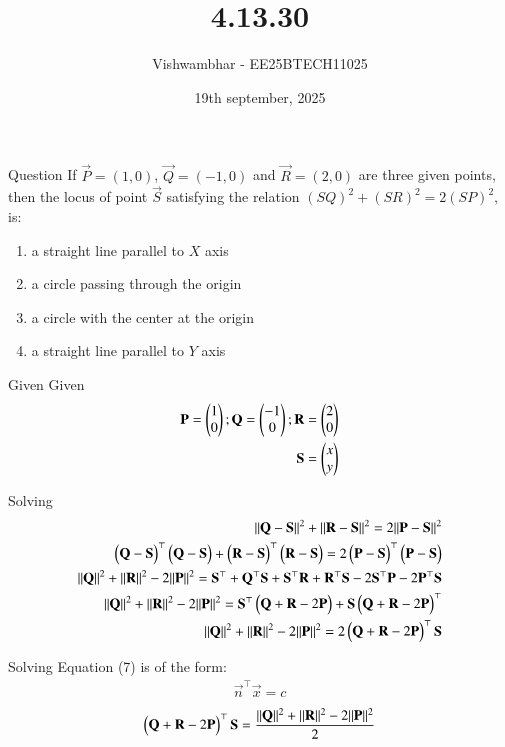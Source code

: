 \documentclass{beamer}
\title{4.13.30}
\date{19th september, 2025}
\author{Vishwambhar - EE25BTECH11025}
\begin{document}
\frame{\titlepage}
\begin{frame}{Question}
If $\vec{P}=(1,0)$, $\vec{Q} = (-1,0)$  and $\vec{R}=(2,0)$ are three given points, then the locus of point $\vec{S}$ satisfying the relation $(SQ)^2+(SR)^2=2(SP)^2$, is:\\
\begin{enumerate}
    \item a straight line parallel to $X$ axis
    \item a circle passing through the origin
    \item a circle with the center at the origin
    \item a straight line parallel to $Y$ axis
\end{enumerate}
\end{frame}

\begin{frame}{Given}
Given
\begin{align}
    \mathbf{P}=\begin{pmatrix}1\\0\end{pmatrix}; \mathbf{Q}=\begin{pmatrix}-1\\0\end{pmatrix}; \mathbf{R}=\begin{pmatrix}2\\0\end{pmatrix}\\
    \mathbf{S}=\begin{pmatrix}x\\y\end{pmatrix}
\end{align}
\end{frame}

\begin{frame}{Solving}
\begin{align}
    ||\mathbf{Q}-\mathbf{S}||^2+||\mathbf{R}-\mathbf{S}||^2=2||\mathbf{P}-\mathbf{S}||^2\\
    \begin{pmatrix}\mathbf{Q}-\mathbf{S}\end{pmatrix}^\top\begin{pmatrix}\mathbf{Q}-\mathbf{S}\end{pmatrix}+\begin{pmatrix}\mathbf{R}-\mathbf{S}\end{pmatrix}^\top\begin{pmatrix}\mathbf{R}-\mathbf{S}\end{pmatrix}=2\begin{pmatrix}\mathbf{P}-\mathbf{S}\end{pmatrix}^\top\begin{pmatrix}\mathbf{P}-\mathbf{S}\end{pmatrix}\\
    ||\mathbf{Q}||^2+||\mathbf{R}||^2-2||\mathbf{P}||^2=\mathbf{S}^\top+\mathbf{Q}^\top\mathbf{S}+\mathbf{S}^\top\mathbf{R}+\mathbf{R}^\top\mathbf{S}-2\mathbf{S}^\top\mathbf{P}-2\mathbf{P}^\top\mathbf{S}\\
    ||\mathbf{Q}||^2+||\mathbf{R}||^2-2||\mathbf{P}||^2=\mathbf{S}^\top\begin{pmatrix}\mathbf{Q}+\mathbf{R}-2\mathbf{P}\end{pmatrix}+\mathbf{S}\begin{pmatrix}\mathbf{Q}+\mathbf{R}-2\mathbf{P}\end{pmatrix}^\top\\
    ||\mathbf{Q}||^2+||\mathbf{R}||^2-2||\mathbf{P}||^2=2\begin{pmatrix}\mathbf{Q}+\mathbf{R}-2\mathbf{P}\end{pmatrix}^\top\mathbf{S}
\end{align}
\end{frame}

\begin{frame}{Solving}
Equation (7) is of the form:
\begin{align}
    \vec{n}^\top\vec{x}=c
\end{align}
\begin{align}
    \begin{pmatrix}\mathbf{Q}+\mathbf{R}-2\mathbf{P}\end{pmatrix}^\top\mathbf{S}= \frac{||\mathbf{Q}||^2+||\mathbf{R}||^2-2||\mathbf{P}||^2}{2}
\end{align}
\end{frame}
\end{document}
